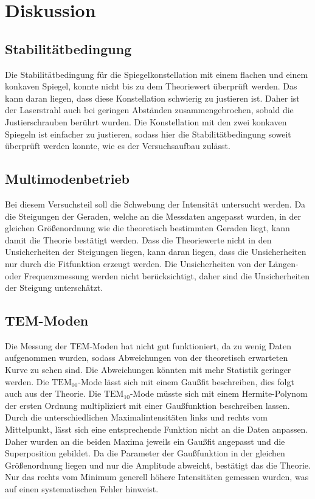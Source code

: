 \section{Diskussion}
\label{sec:Diskussion}

\subsection{Stabilitätbedingung}
Die Stabilitätbedingung für die Spiegelkonstellation mit einem flachen und einem konkaven Spiegel, konnte 
nicht bis zu dem Theoriewert überprüft werden. Das kann daran liegen, dass diese Konstellation schwierig zu 
justieren ist. Daher ist der Laserstrahl auch bei geringen Abständen zusammengebrochen, sobald die Justierschrauben 
berührt wurden. Die Konstellation mit den zwei konkaven Spiegeln ist einfacher zu justieren, sodass hier die Stabilitätbedingung
soweit überprüft werden konnte, wie es der Versuchsaufbau zulässt.

\subsection{Multimodenbetrieb}
Bei diesem Versuchsteil soll die Schwebung der Intensität untersucht werden. Da die Steigungen der Geraden, welche an die 
Messdaten angepasst wurden, in der gleichen Größenordnung wie die theoretisch bestimmten Geraden liegt, kann damit die 
Theorie bestätigt werden. Dass die Theoriewerte nicht in den Unsicherheiten der Steigungen liegen, kann daran liegen, dass
die Unsicherheiten nur durch die Fitfunktion erzeugt werden. Die Unsicherheiten von der Längen- oder Frequenzmessung werden 
nicht berücksichtigt, daher sind die Unsicherheiten der Steigung unterschätzt.

\subsection{TEM-Moden}
Die Messung der TEM-Moden hat nicht gut funktioniert, da zu wenig Daten aufgenommen wurden, sodass Abweichungen 
von der theoretisch erwarteten Kurve zu sehen sind. Die Abweichungen könnten mit mehr Statistik geringer werden. 
Die $\text{TEM}_{00}$-Mode lässt sich mit einem Gaußfit beschreiben, dies folgt auch aus der Theorie. Die 
$\text{TEM}_{10}$-Mode müsste sich mit einem Hermite-Polynom der ersten Ordnung multipliziert mit einer Gaußfunktion 
beschreiben lassen. Durch die unterschiedlichen Maximalintensitäten links und rechts vom Mittelpunkt, lässt sich 
eine entsprechende Funktion nicht an die Daten anpassen. Daher wurden an die beiden Maxima jeweils ein Gaußfit angepasst und die 
Superposition gebildet. Da die Parameter der Gaußfunktion in der gleichen Größenordnung liegen und nur die Amplitude 
abweicht, bestätigt das die Theorie. Nur das rechts vom Minimum generell höhere Intensitäten gemessen wurden, was auf einen systematischen
Fehler hinweist.

